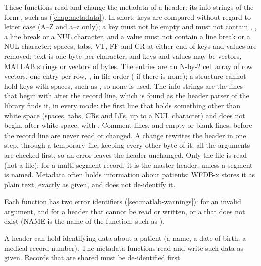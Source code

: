 These functions read and change the metadata of a header: its info strings of the form
, such as  (\cref{chap:metadata}). In short: keys are
compared without regard to letter case (A--Z and a--z only); a key must not be empty and
must not contain \code{:}, \code{\#}, a line break or a NUL character, and a value must
not contain a line break or a NUL character; spaces, tabs, VT, FF and CR at either end of
keys and values are removed; text is one byte per character, and keys and values may be
 vectors, MATLAB strings or  vectors of bytes. The entries are an
N-by-2 cell array of  row vectors, one entry per row, , in file order ( if there is none); a structure cannot hold keys
with spaces, such as , so none is used. The info strings are the
lines that begin with \code{\#} after the record line, which is found as the header
parser of the library finds it, in every mode: the first line that holds something
other than white space (spaces, tabs, CRs and LFs, up to a NUL character) and does not
begin, after white space, with \code{\#}. Comment lines, and empty or blank lines,
before the record line are never read or changed. A change rewrites the header
in one step, through a temporary file, keeping every other byte of it; all the arguments
are checked first, so an error leaves the header unchanged. Only the  file is
read (not a  file); for a multi-segment record, it is the master header,
unless a segment is named. Metadata often holds information about patients: WFDB-x stores
it as plain text, exactly as given, and does not de-identify it.

Each function has two error identifiers (\cref{sec:matlab-warnings}): 
for an invalid argument, and  for a header that cannot be read or
written, or a  that does not exist (NAME is the name of the function, such as
).

\begin{phibox}
A header can hold identifying data about a patient (a name, a date of birth, a medical
record number). The metadata functions read and write such data as given. Records that
are shared must be de-identified first.
\end{phibox}

